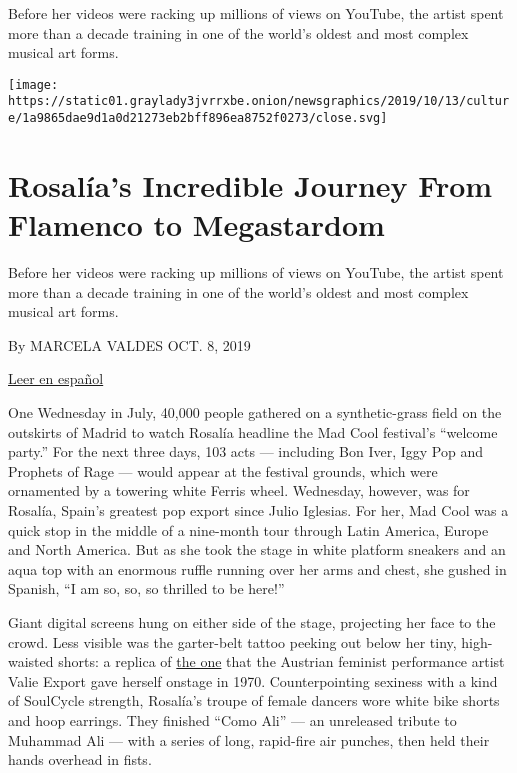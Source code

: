 Before her videos were racking up millions of views on YouTube, the
artist spent more than a decade training in one of the world's oldest
and most complex musical art forms.

\texttt{[image: https://static01.graylady3jvrrxbe.onion/newsgraphics/2019/10/13/culture/1a9865dae9d1a0d21273eb2bff896ea8752f0273/close.svg]}

\hypertarget{rosaluxedas-incredible-journey-from-flamenco-to-megastardom-1}{%
\section{Rosalía's Incredible Journey From Flamenco to
Megastardom}\label{rosaluxedas-incredible-journey-from-flamenco-to-megastardom-1}}

Before her videos were racking up millions of views on YouTube, the
artist spent more than a decade training in one of the world's oldest
and most complex musical art forms.

By MARCELA VALDES OCT. 8, 2019

\href{https://www.nytimes3xbfgragh.onion/2019/10/08/magazine/rosalia-espanol.html}{Leer
en español}

One Wednesday in July, 40,000 people gathered on a synthetic-grass field
on the outskirts of Madrid to watch Rosalía headline the Mad Cool
festival's ``welcome party.'' For the next three days, 103 acts ---
including Bon Iver, Iggy Pop and Prophets of Rage --- would appear at
the festival grounds, which were ornamented by a towering white Ferris
wheel. Wednesday, however, was for Rosalía, Spain's greatest pop export
since Julio Iglesias. For her, Mad Cool was a quick stop in the middle
of a nine-month tour through Latin America, Europe and North America.
But as she took the stage in white platform sneakers and an aqua top
with an enormous ruffle running over her arms and chest, she gushed in
Spanish, ``I am so, so, so thrilled to be here!''

Giant digital screens hung on either side of the stage, projecting her
face to the crowd. Less visible was the garter-belt tattoo peeking out
below her tiny, high-waisted shorts: a replica of
\href{http://www.artnet.com/artists/valie-export/tatoo-i-wa4xN3xGsJ3mOixnrc1O3A2}{the
one} that the Austrian feminist performance artist Valie Export gave
herself onstage in 1970. Counterpointing sexiness with a kind of
SoulCycle strength, Rosalía's troupe of female dancers wore white bike
shorts and hoop earrings. They finished ``Como Ali'' --- an unreleased
tribute to Muhammad Ali --- with a series of long, rapid-fire air
punches, then held their hands overhead in fists.

